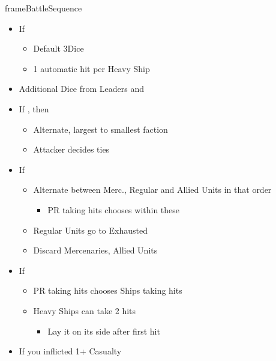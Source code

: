 \documentclass[10pt]{article}
\begin{document}
\begin{dynamiccontents*}{frameBattleSequence}
\begin{multicols}{3}
\begin{itemize}
\begin{itemize}
\begin{itemize}
				\end{itemize}
			\end{itemize}
			\item If 
			\begin{itemize}
				\item Default 3\artillery Dice
				\item 1 automatic hit per Heavy Ship 
			\end{itemize}
			\item Additional Dice from Leaders and \battleactions
		\end{itemize}
		\begin{itemize}
			\item If , then
			\begin{itemize}
				\item Alternate, largest to smallest faction
				\item Attacker decides ties
			\end{itemize}
			\item If 
			\begin{itemize}
				\item Alternate between Merc., Regular and Allied Units in that order
				\begin{itemize}
					\item PR taking hits chooses within these
				\end{itemize}
				\item Regular Units go to Exhausted \manpower
				\item Discard Mercenaries, Allied Units
			\end{itemize}
			\item If 
			\begin{itemize}
				\item PR taking hits chooses Ships taking hits
				\item Heavy Ships can take 2 hits
				\begin{itemize}
					\item Lay it on its side after first hit
				\end{itemize}
			\end{itemize}
		\end{itemize}
		\begin{itemize}
			\item If you inflicted 1+ Casualty
			\begin{itemize}

\end{itemize}
\end{itemize}
\end{multicols}
\end{dynamiccontents*}
\end{document}
